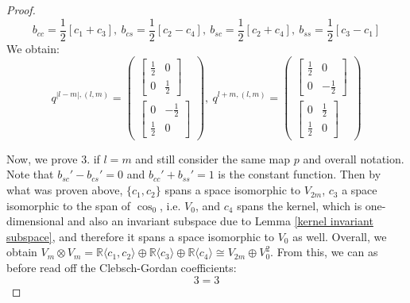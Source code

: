 \documentclass[12pt, a4paper]{article}
\theoremstyle{plain}
\theoremstyle{definition}
\theoremstyle{remark}
\newcommand{\R}{\mathds{R}}
\begin{document}
\begin{proof}
\begin{equation*}
b_{cc} = \frac{1}{2} \left[ c_1 + c_3\right], \  b_{cs} = \frac{1}{2} \left[ c_2 - c_4\right], \  b_{sc} = \frac{1}{2} \left[ c_2 + c_4 \right], \  b_{ss} = \frac{1}{2} \left[ c_3 - c_1\right]
\end{equation*}
We obtain:
\begin{equation*}
q^{|l-m|,(l,m)} = \begin{pmatrix}\begin{bmatrix} \frac{1}{2} & 0 \\ 0 & \frac{1}{2}\end{bmatrix} \\ \begin{bmatrix} 0 & -\frac{1}{2} \\ \frac{1}{2} & 0\end{bmatrix} \end{pmatrix}, \ q^{l+m, (l,m)} = \begin{pmatrix}\begin{bmatrix} \frac{1}{2} & 0 \\ 0 & -\frac{1}{2}\end{bmatrix} \\ \begin{bmatrix} 0 & \frac{1}{2} \\ \frac{1}{2} & 0\end{bmatrix} \end{pmatrix}
\end{equation*}

Now, we prove $3$. if $l = m$ and still consider the same map $p$ and overall notation. Note that $b_{sc}' - b_{cs}' = 0$ and $b_{cc}' + b_{ss}' = 1$ is the constant function. Then by what was proven above, $\{c_1, c_2\}$ spans a space isomorphic to $V_{2m}$, $c_3$ a space isomorphic to the span of $\cos_0$, i.e. $V_0$, and $c_4$ spans the kernel, which is one-dimensional and also an invariant subspace due to Lemma \ref{kernel invariant subspace}, and therefore it spans a space isomorphic to $V_0$ as well. Overall, we obtain $V_m \otimes V_m = \R\langle c_1, c_2\rangle \oplus \R\langle c_3\rangle  \oplus \R\langle c_4\rangle \cong V_{2m} \oplus V_0^2$. From this, we can as before read off the Clebsch-Gordan coefficients:
\begin{equation*}
3 = 3
\end{equation*}

\begin{comment}
What's missing is an explicit description of the projections corresponding to this isomorphism in terms of the standard basis of $V_m \otimes V_m$. Note that $b_{cc} = \frac{1}{2} \left[ c_1 + c_3\right]$, $b_{cs} = \frac{1}{2} \left[ c_2 - c_4\right]$, $b_{sc} = \frac{1}{2} \left[ c_2 + c_4 \right]$, $b_{ss} = \frac{1}{2} \left[ c_3 - c_1\right]$.


\end{comment}
\end{proof}
\end{document}
